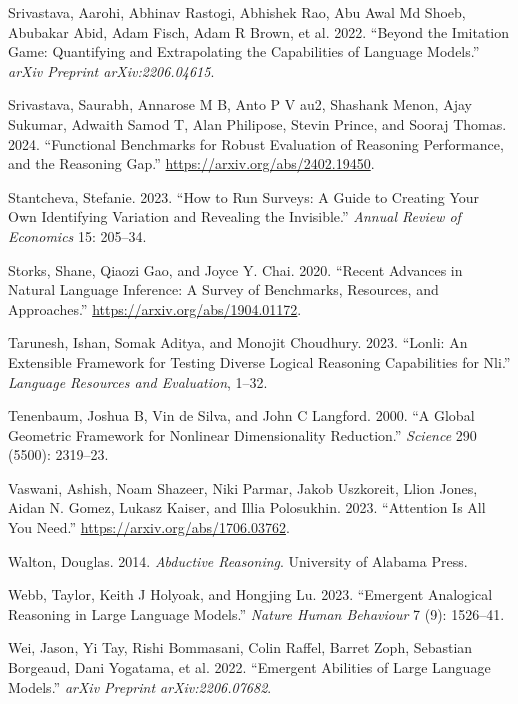 \documentclass[
]{article}
\newlength{\cslhangindent}
\newenvironment{CSLReferences}[2] %
 {\begin{list}{}{%
  \setlength{\itemindent}{0pt}
  \setlength{\leftmargin}{0pt}
  \setlength{\parsep}{0pt}
  \ifodd #1
   \setlength{\leftmargin}{\cslhangindent}
   \setlength{\itemindent}{-1\cslhangindent}
  \fi
  \setlength{\itemsep}{#2\baselineskip}}}
 {\end{list}}
\begin{document}
\begin{CSLReferences}{1}{0}
Srivastava, Aarohi, Abhinav Rastogi, Abhishek Rao, Abu Awal Md Shoeb,
Abubakar Abid, Adam Fisch, Adam R Brown, et al. 2022. {``Beyond the
Imitation Game: Quantifying and Extrapolating the Capabilities of
Language Models.''} \emph{arXiv Preprint arXiv:2206.04615}.

Srivastava, Saurabh, Annarose M B, Anto P V au2, Shashank Menon, Ajay
Sukumar, Adwaith Samod T, Alan Philipose, Stevin Prince, and Sooraj
Thomas. 2024. {``Functional Benchmarks for Robust Evaluation of
Reasoning Performance, and the Reasoning Gap.''}
\url{https://arxiv.org/abs/2402.19450}.

Stantcheva, Stefanie. 2023. {``How to Run Surveys: A Guide to Creating
Your Own Identifying Variation and Revealing the Invisible.''}
\emph{Annual Review of Economics} 15: 205--34.

Storks, Shane, Qiaozi Gao, and Joyce Y. Chai. 2020. {``Recent Advances
in Natural Language Inference: A Survey of Benchmarks, Resources, and
Approaches.''} \url{https://arxiv.org/abs/1904.01172}.

Tarunesh, Ishan, Somak Aditya, and Monojit Choudhury. 2023. {``Lonli: An
Extensible Framework for Testing Diverse Logical Reasoning Capabilities
for Nli.''} \emph{Language Resources and Evaluation}, 1--32.

Tenenbaum, Joshua B, Vin de Silva, and John C Langford. 2000. {``A
Global Geometric Framework for Nonlinear Dimensionality Reduction.''}
\emph{Science} 290 (5500): 2319--23.

Vaswani, Ashish, Noam Shazeer, Niki Parmar, Jakob Uszkoreit, Llion
Jones, Aidan N. Gomez, Lukasz Kaiser, and Illia Polosukhin. 2023.
{``Attention Is All You Need.''} \url{https://arxiv.org/abs/1706.03762}.

Walton, Douglas. 2014. \emph{Abductive Reasoning}. University of Alabama
Press.

Webb, Taylor, Keith J Holyoak, and Hongjing Lu. 2023. {``Emergent
Analogical Reasoning in Large Language Models.''} \emph{Nature Human
Behaviour} 7 (9): 1526--41.

Wei, Jason, Yi Tay, Rishi Bommasani, Colin Raffel, Barret Zoph,
Sebastian Borgeaud, Dani Yogatama, et al. 2022. {``Emergent Abilities of
Large Language Models.''} \emph{arXiv Preprint arXiv:2206.07682}.


\end{CSLReferences}
\end{document}
